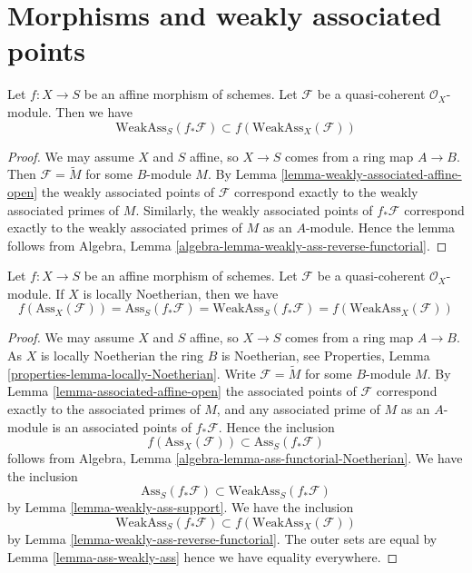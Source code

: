 \section{Morphisms and weakly associated points}
\label{section-morphisms-weakly-associated}

\begin{lemma}
\label{lemma-weakly-ass-reverse-functorial}
Let $f : X \to S$ be an affine morphism of schemes.
Let $\mathcal{F}$ be a quasi-coherent $\mathcal{O}_X$-module.
Then we have
$$
\text{WeakAss}_S(f_*\mathcal{F}) \subset f(\text{WeakAss}_X(\mathcal{F}))
$$
\end{lemma}

\begin{proof}
We may assume $X$ and $S$ affine, so $X \to S$ comes from a ring map
$A \to B$. Then $\mathcal{F} = \widetilde M$ for some $B$-module $M$. By
Lemma \ref{lemma-weakly-associated-affine-open}
the weakly associated points of $\mathcal{F}$ correspond exactly to the
weakly associated primes of $M$. Similarly, the weakly associated points
of $f_*\mathcal{F}$ correspond exactly to the weakly associated primes
of $M$ as an $A$-module. Hence the lemma follows from
Algebra, Lemma \ref{algebra-lemma-weakly-ass-reverse-functorial}.
\end{proof}

\begin{lemma}
\label{lemma-ass-functorial-equal}
Let $f : X \to S$ be an affine morphism of schemes.
Let $\mathcal{F}$ be a quasi-coherent $\mathcal{O}_X$-module.
If $X$ is locally Noetherian, then we have
$$
f(\text{Ass}_X(\mathcal{F})) =
\text{Ass}_S(f_*\mathcal{F}) =
\text{WeakAss}_S(f_*\mathcal{F}) =
f(\text{WeakAss}_X(\mathcal{F}))
$$
\end{lemma}

\begin{proof}
We may assume $X$ and $S$ affine, so $X \to S$ comes from a ring map
$A \to B$. As $X$ is locally Noetherian the ring $B$ is Noetherian, see
Properties, Lemma \ref{properties-lemma-locally-Noetherian}.
Write $\mathcal{F} = \widetilde M$ for some $B$-module $M$. By
Lemma \ref{lemma-associated-affine-open}
the associated points of $\mathcal{F}$ correspond exactly to the associated
primes of $M$, and any associated prime of $M$ as an $A$-module is an
associated points of $f_*\mathcal{F}$.
Hence the inclusion
$$
f(\text{Ass}_X(\mathcal{F})) \subset \text{Ass}_S(f_*\mathcal{F})
$$
follows from
Algebra, Lemma \ref{algebra-lemma-ass-functorial-Noetherian}.
We have the inclusion
$$
\text{Ass}_S(f_*\mathcal{F}) \subset \text{WeakAss}_S(f_*\mathcal{F})
$$
by
Lemma \ref{lemma-weakly-ass-support}.
We have the inclusion
$$
\text{WeakAss}_S(f_*\mathcal{F}) \subset f(\text{WeakAss}_X(\mathcal{F}))
$$
by
Lemma \ref{lemma-weakly-ass-reverse-functorial}.
The outer sets are equal by
Lemma \ref{lemma-ass-weakly-ass}
hence we have equality everywhere.
\end{proof}


